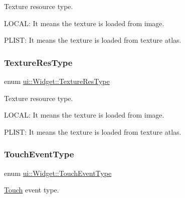 Texture resource type.
\begin{DoxyItemize}
\item L\+O\+C\+AL\+: It means the texture is loaded from image.
\item P\+L\+I\+ST\+: It means the texture is loaded from texture atlas. 
\end{DoxyItemize}\mbox{\label{classui_1_1Widget_a040a65ec5ad3b11119b7e16b98bd9af0}} 
\subsubsection{\texorpdfstring{Texture\+Res\+Type}{TextureResType}\hspace{0.1cm}{\footnotesize\ttfamily [2/2]}}
{\footnotesize\ttfamily enum \hyperlink{classui_1_1Widget_a040a65ec5ad3b11119b7e16b98bd9af0}{ui\+::\+Widget\+::\+Texture\+Res\+Type}\hspace{0.3cm}{\ttfamily [strong]}}

Texture resource type.
\begin{DoxyItemize}
\item L\+O\+C\+AL\+: It means the texture is loaded from image.
\item P\+L\+I\+ST\+: It means the texture is loaded from texture atlas. 
\end{DoxyItemize}\mbox{\label{classui_1_1Widget_a4829c0f1cbaf1fd820a9b2ccf0c58c73}} 
\subsubsection{\texorpdfstring{Touch\+Event\+Type}{TouchEventType}\hspace{0.1cm}{\footnotesize\ttfamily [1/2]}}
{\footnotesize\ttfamily enum \hyperlink{classui_1_1Widget_a4829c0f1cbaf1fd820a9b2ccf0c58c73}{ui\+::\+Widget\+::\+Touch\+Event\+Type}\hspace{0.3cm}{\ttfamily [strong]}}

\hyperlink{classTouch}{Touch} event type. \mbox{\label{classui_1_1Widget_a4829c0f1cbaf1fd820a9b2ccf0c58c73}} 
